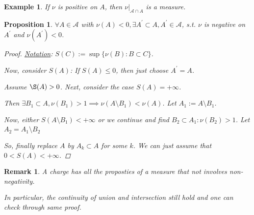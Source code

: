 \documentclass[12pt]{article}
\theoremstyle{blueplain}
\newtheorem{proposition}[theorem]{Proposition}
\theoremstyle{bluedef}
\theoremstyle{blueremark}
\newtheorem{remark}{Remark}[section]
\newtheorem{example}{Example}[section]
\numberwithin{equation}{section}
\begin{document}
\begin{example}
  If $\nu$ is positive on $A$, then $\nu|_{\mathcal{A} \cap A}$ is a measure.
\end{example}

\begin{proposition}
  $\forall A \in \mathcal{A}$ with $\nu(A) < 0, \exists A^\prime \subset A, A^\prime \in \mathcal{A}$, s.t. $\nu$ is negative on $A^\prime$ and $\nu(A^\prime)<0$.
  \begin{proof}
    \underline{Notation}: $S(C):=\sup\{\nu(B):B\subset C\}$.

    Now, consider $S(A)$: If $S(A)\leq 0$, then just choose $A^\prime = A$.

    Assume $\S(A)>0$. Next, consider the case $S(A) = +\infty$.

    Then $\exists B_1 \subset A, \nu(B_1) >1 \implies \nu(A \setminus B_1) < \nu(A)$. Let $A_1 := A \setminus B_1$.

    Now, either $S(A\setminus B_1) < +\infty$ or we continue and find $B_2\subset A_1: \nu(B_2) >1$. Let $A_2 = A_1\setminus B_2$









    So, finally replace $A$ by $A_k \subset A$ for some $k$. We can just assume that $0 < S(A) < +\infty$.






  \end{proof}
\end{proposition}

\begin{remark}
  A charge has all the proposties of a measure that not involves non-negativity.

  In particular, the continuity of union and intersection still hold and one can check through same proof.
\end{remark}
\end{document}
